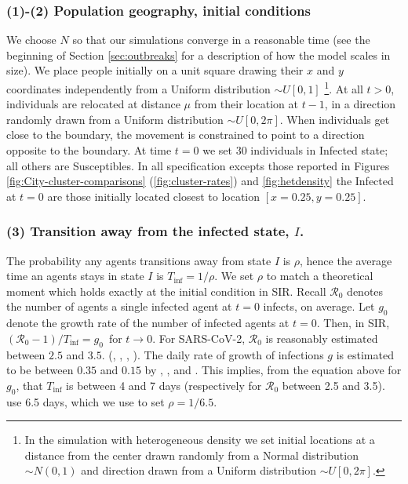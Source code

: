\documentclass[english,11pt]{article}
\begin{document}
\subsubsection*{(1)-(2) Population geography, initial conditions}	
We choose $N$ so that our simulations converge in a reasonable time (see the beginning of 
	Section \ref{sec:outbreaks} for a description of how the model scales in size). We place people      initially on a unit square
	drawing their $x$ and $y$ coordinates independently from a Uniform distribution 
	$\sim U[0,1]$%
	\footnote{In the simulation with heterogeneous density we set initial locations at a distance 
	from the center drawn randomly from a Normal distribution $\sim N(0,1)$ and direction
	drawn from a Uniform distribution  $\sim U[0,2\pi]$.}.
	At all $t>0$, individuals 
	are relocated at distance $\mu$ from their location at $t-1$, in a direction randomly
	drawn  from a Uniform distribution  $\sim U[0,2\pi]$. When individuals get close to the boundary, 
	the movement is constrained to point to a direction opposite to the boundary. At time $t=0$ we  
	set 30 individuals in Infected state; all 
	others are Susceptibles. In all specification excepts those reported in Figures  \ref{fig:City-cluster-comparisons} (\ref{fig:cluster-rates}) and  \ref{fig:hetdensity} the 
	Infected at $t= 0$ are those initially located closest to location $
	[x=0.25,y=0.25]$. 
	\smallskip

\subsubsection*{(3) Transition away from the infected state, $I$.}  

    The probability 
	 any agents transitions away from state $I$ is $\rho$, hence the average time an agents stays in state  $I$ is 
	 $T_\text{inf}={1}/{\rho}$. 
	 We set $\rho$ to match a theoretical moment which holds exactly at the initial condition in SIR. Recall $\mathcal{R}_{0}$ denotes the number of agents a single infected agent at $t=0$ 
	 infects, on average. Let $g_0$ 
 	denote the growth rate of the number of infected agents at $t=0$. Then, in SIR, 
	${(\mathcal{R}_{0}-1)}/{T_\text{inf}}=g_0$\
	for $t \rightarrow 0$. 
	For SARS-CoV-2, $\mathcal{R}_{0}$ is reasonably estimated
	between $2.5$ and $3.5$. (\cite{huang2020clinical},
	\cite{remuzzi2020covid},
	\cite{zhang2020estimation},
	\cite{paules2020coronavirus}). 
	The daily rate of growth of infections $g$ is estimated to be between $0.35$ and $0.15$
	by \cite{kaplan2020gianluca}, \cite{alvarez2020simple}, and \cite{ferguson2020report}. This implies, from the equation above for $g_0$, that $T_\text{inf}$ is between 4 and 7 days
	(respectively for $\mathcal{R}_{0}$ between 2.5 and 3.5).  \cite{ferguson2020report} use 6.5 days, which we use to set $\rho=1/6.5$. 
	
\end{document}
